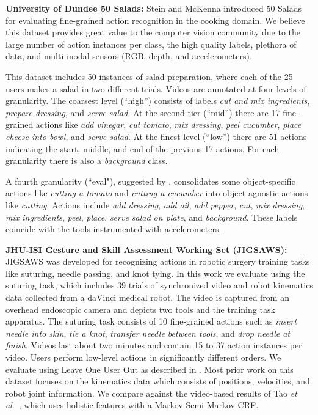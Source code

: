 \documentclass[runningheads]{llncs}
\newcommand{\fakesubsection}[1]{\smallskip\noindent\textbf{#1:}}
\newcommand{\etal}{\emph{et al}.}
\begin{document}
\fakesubsection{University of Dundee 50 Salads}
Stein and McKenna introduced 50 Salads \cite{stein_ubicomp_2013} for evaluating fine-grained action recognition in the cooking domain. 
We believe this dataset provides great value to the computer vision community due to the large number of action instances per class, the high quality labels, plethora of data, and multi-modal sensors (RGB, depth, and accelerometers). 





This dataset includes 50 instances of salad preparation, where each of the 25 users makes a salad in two different trials. 
Videos are annotated at four levels of granularity. The coarsest level (``high'') consists of labels \textit{cut and mix ingredients}, \textit{prepare dressing}, and \textit{serve salad}. At the second tier (``mid'') there are 17 fine-grained actions like \textit{add vinegar}, \textit{cut tomato}, \textit{mix dressing}, \textit{peel cucumber}, \textit{place cheese into bowl}, and \textit{serve salad}. At the finest level (``low'') there are 51 actions indicating the start, middle, and end of the previous 17 actions. For each granularity there is also a \textit{background} class. 




A fourth granularity (``eval"), suggested by \cite{stein_ubicomp_2013}, consolidates some object-specific actions like \textit{cutting a tomato} and \textit{cutting a cucumber} into object-agnostic actions like \textit{cutting}.
Actions include \textit{add dressing}, \textit{add oil}, \textit{add pepper}, \textit{cut}, \textit{mix dressing}, \textit{mix ingredients}, \textit{peel}, \textit{place}, \textit{serve salad on plate}, and \textit{background}. These labels coincide with the tools instrumented with accelerometers.






\fakesubsection{JHU-ISI Gesture and Skill Assessment Working Set (JIGSAWS)}\\
JIGSAWS \cite{JIGSAWS} was developed for recognizing actions in robotic surgery training tasks like suturing, needle passing, and knot tying. 
In this work we evaluate using the suturing task, which includes 39 trials of synchronized video and robot kinematics data collected from a daVinci medical robot. The video is captured from an overhead endoscopic camera and depicts two tools and the training task apparatus. 
The suturing task consists of 10 fine-grained actions such as \textit{insert needle into skin}, \textit{tie a knot}, \textit{transfer needle between tools}, and \textit{drop needle at finish}.
Videos last about two minutes and contain 15 to 37 action instances per video. 
Users perform low-level actions in significantly different orders.
We evaluate using Leave One User Out as described in \cite{JIGSAWS}. 
Most prior work on this dataset focuses on the kinematics data which consists of positions, velocities, and robot joint information. We compare against the video-based results of Tao \etal~\cite{tao_miccai_2013}, which uses holistic features with a Markov Semi-Markov CRF.
\end{document}
